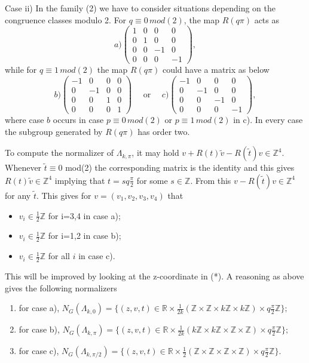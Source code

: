 \documentclass[11pt]{amsart}
\theoremstyle{plain}
\theoremstyle{definition}
\theoremstyle{remark}
\begin{document}
  \smallskip
  
  Case ii)   In the family (2) we have to consider situations depending on the congruence classes modulo 2. For $q\equiv 0 \,mod(2)$, the map $R(q\pi)$ acts as 
  $$a) \left( \begin{matrix} 
  1 & 0 & 0 & 0\\
  0 & 1 & 0 & 0\\
  0 & 0 & -1 & 0\\
  0 & 0 & 0 & -1
  \end{matrix}
  \right),$$
  while for $q\equiv 1\,mod(2)$ the map $R(q\pi)$ could have  a matrix as below
  $$b)  \left( \begin{matrix} 
  -1 & 0 & 0 & 0\\
  0 & -1 &0 & 0\\
  0 & 0 & 1 & 0\\
  0 & 0 & 0 & 1
  \end{matrix}
  \right)\quad \mbox{ or } \quad  c) \left( \begin{matrix} 
  -1 & 0 & 0 & 0\\
  0 & -1 &0 & 0\\
  0 & 0 & -1 & 0\\
  0 & 0 & 0 & -1
  \end{matrix}
  \right), 
  $$
  where case $b$ occurs in case $p\equiv 0\, mod(2)$ or $p\equiv 1\, mod(2)$ in c). In every case the subgroup generated by $R(q\pi)$ has order two.  
  
  To compute the normalizer of $\Lambda_{k,\pi}$, it may hold
  $v+R(t)\tilde{v}-R(\tilde{t})v\in \mathbb Z^4.$ Whenever  $\tilde{t}\equiv 0$ mod(2) the corresponding matrix is the identity and this gives  $R(t)\tilde{v}\in \mathbb Z^4$ implying that $t=sq\frac{\pi}2$ for some $s\in \mathbb Z$. From this $v-R(\tilde{t})v\in \mathbb Z^4$ for any $\tilde{t}$. This gives
  for $v=(v_1,v_2,v_3,v_4)$ that
  \begin{itemize}
  	\item $v_i\in \frac12 \mathbb Z$ for i=3,4 in case a);
  	\item  $v_i\in \frac12 \mathbb Z$ for i=1,2 in case b);
  	\item $v_i\in \frac12 \mathbb Z$ for all $i$ in case c).
  \end{itemize}
This will be improved by looking at the z-coordinate in (*). A reasoning as above gives the following normalizers
\begin{enumerate}
	\item for case a),  $N_G(\Lambda_{k,0})=\{(z,v,t)\in \mathbb R\times \frac{1}{2k}(\mathbb Z\times \mathbb Z \times k\mathbb Z \times k\mathbb Z) \times q\frac{\pi}2\mathbb Z\};$
	\item  for case b),  $N_G(\Lambda_{k,\pi})=\{(z,v,t)\in \mathbb R\times \frac{1}{2k}(k\mathbb Z\times k\mathbb Z \times \mathbb Z \times \mathbb Z) \times q\frac{\pi}2\mathbb Z\};$
		\item  for case c),  $N_G(\Lambda_{k,\pi/2})=\{(z,v,t)\in \mathbb R\times \frac{1}{2}(\mathbb Z\times \mathbb Z \times \mathbb Z \times \mathbb Z) \times q\frac{\pi}2\mathbb Z\}.$
	\end{enumerate}
\end{document}
